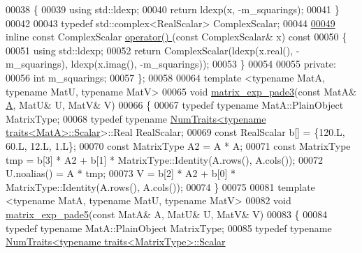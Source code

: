 \begin{DoxyCode}
00038 \textcolor{keyword}{  }\{
00039     \textcolor{keyword}{using} std::ldexp;
00040     \textcolor{keywordflow}{return} ldexp(x, -m\_squarings);
00041   \}
00042 
00043   \textcolor{keyword}{typedef} std::complex<RealScalar> ComplexScalar;
00044 
\hyperlink{struct_eigen_1_1internal_1_1_matrix_exponential_scaling_op_a7c0d08f36bf3d6f8f6db34b3d3eb2b40}{00049}   \textcolor{keyword}{inline} \textcolor{keyword}{const} ComplexScalar \hyperlink{struct_eigen_1_1internal_1_1_matrix_exponential_scaling_op_ad4c95fe9fcbf59981c2a5a0a4e42041d}{operator() }(\textcolor{keyword}{const} ComplexScalar& x)\textcolor{keyword}{ const}
00050 \textcolor{keyword}{  }\{
00051     \textcolor{keyword}{using} std::ldexp;
00052     \textcolor{keywordflow}{return} ComplexScalar(ldexp(x.real(), -m\_squarings), ldexp(x.imag(), -m\_squarings));
00053   \}
00054 
00055   \textcolor{keyword}{private}:
00056     \textcolor{keywordtype}{int} m\_squarings;
00057 \};
00058 
00064 \textcolor{keyword}{template} <\textcolor{keyword}{typename} MatA, \textcolor{keyword}{typename} MatU, \textcolor{keyword}{typename} MatV>
00065 \textcolor{keywordtype}{void} \hyperlink{namespace_eigen_1_1internal_a7e6cf2e01b6fb376d33b9bb8183e5777}{matrix\_exp\_pade3}(\textcolor{keyword}{const} MatA& \hyperlink{group___core___module_class_eigen_1_1_matrix}{A}, MatU& U, MatV& V)
00066 \{
00067   \textcolor{keyword}{typedef} \textcolor{keyword}{typename} MatA::PlainObject MatrixType;
00068   \textcolor{keyword}{typedef} \textcolor{keyword}{typename} \hyperlink{group___core___module_struct_eigen_1_1_num_traits}{NumTraits<typename traits<MatA>::Scalar}>::Real 
      RealScalar;
00069   \textcolor{keyword}{const} RealScalar b[] = \{120.L, 60.L, 12.L, 1.L\};
00070   \textcolor{keyword}{const} MatrixType A2 = A * A;
00071   \textcolor{keyword}{const} MatrixType tmp = b[3] * A2 + b[1] * MatrixType::Identity(A.rows(), A.cols());
00072   U.noalias() = A * tmp;
00073   V = b[2] * A2 + b[0] * MatrixType::Identity(A.rows(), A.cols());
00074 \}
00075 
00081 \textcolor{keyword}{template} <\textcolor{keyword}{typename} MatA, \textcolor{keyword}{typename} MatU, \textcolor{keyword}{typename} MatV>
00082 \textcolor{keywordtype}{void} \hyperlink{namespace_eigen_1_1internal_af4992d182490219270a24aaa8285e63a}{matrix\_exp\_pade5}(\textcolor{keyword}{const} MatA& A, MatU& U, MatV& V)
00083 \{
00084   \textcolor{keyword}{typedef} \textcolor{keyword}{typename} MatA::PlainObject MatrixType;
00085   \textcolor{keyword}{typedef} \textcolor{keyword}{typename} \hyperlink{group___core___module_struct_eigen_1_1_num_traits}{NumTraits<typename traits<MatrixType>::Scalar}

\end{DoxyCode}
